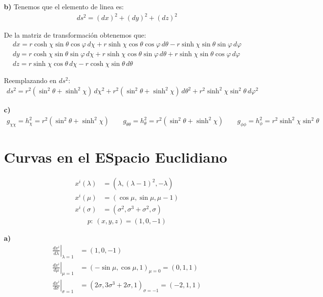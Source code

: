 \documentclass{article}
\begin{document}
\hfill 

\textbf{b) } Tenemos que el elemento de linea es:
\begin{gather*}
    ds^2 = (dx)^2 +(dy)^2 +(dz)^2 
\end{gather*}

De la matriz de transformación obtenemos que: 
\begin{gather*}
    dx = r \cosh \chi \sin \theta \cos \varphi \, d\chi + r \sinh \chi \cos \theta \cos \varphi \, d\theta - r \sinh \chi \sin \theta \sin \varphi \, d\varphi\\
    dy = r \cosh \chi \sin \theta \sin \varphi \, d\chi + r \sinh \chi \cos \theta \sin \varphi \, d\theta + r \sinh \chi \sin \theta \cos \varphi \, d\varphi \\
    dz = r \sinh \chi \cos \theta \, d\chi - r \cosh \chi \sin \theta \, d\theta
\end{gather*}

Reemplazando en $ ds^2 $: 
\begin{gather*}
     ds^2 =  r^2 (\sin^2 \theta +\sinh^2\chi) \, d\chi^2 + r^2(\sin^2 \theta +\sinh^2\chi) \, d\theta^2 + r^2\sinh^2 \chi \sin^2 \theta \, d\varphi^2
\end{gather*}

\hfill 

\textbf{c) }
\begin{gather*}
    g _{\chi\chi } = h^2_\chi =  r^2 (\sin^2 \theta +\sinh^2\chi) \qquad g _{\theta\theta }  = h_\theta^2 = r^2(\sin^2 \theta +\sinh^2\chi) \qquad g _{\phi\phi }  = h_\phi^2 =  r^2\sinh^2 \chi \sin^2 \theta
\end{gather*}








\section{Curvas en el ESpacio Euclidiano }
\[\begin{aligned}
    x^i(\lambda) & = (\lambda, (\lambda - 1)^2, -\lambda)\\
x^i(\mu) & = (\cos \mu, \sin \mu, \mu - 1)\\
x^i(\sigma) & = (\sigma^2, \sigma^3 + \sigma^2, \sigma)
\end{aligned}
\]
\begin{gather*}
    p : \ (x,y,z) = (1,0,-1) 
\end{gather*}

\textbf{a) } 
\begin{align*}
    \left. \frac{d x^i  }{d \lambda}\right| _{\lambda=1 } &= (1,0,-1) \\ 
        \left. \frac{d x^i  }{d \mu}\right| _{\mu=1 }&= (- \sin{\mu }, \cos{\mu }, 1 ) _{\mu = 0 }  = (0,1,1) \\ 
            \left. \frac{d x^i  }{d \sigma}\right| _{\sigma=1 }&= ( 2\sigma, 3\sigma^3 + 2 \sigma , 1  ) _{\sigma = -1}  = (-2,1,1)
\end{align*}
\end{document}
